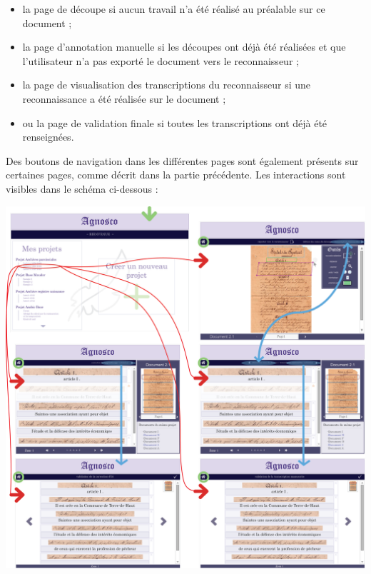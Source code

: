 \begin{itemize}
\item la page de découpe si aucun travail n’a été réalisé au préalable sur ce document ;
\item la page d’annotation manuelle si les découpes ont déjà été réalisées et que l’utilisateur n’a pas exporté le document vers le reconnaisseur ;
\item la page de visualisation des transcriptions du reconnaisseur si une reconnaissance a été réalisée sur le document ;
\item ou la page de validation finale si toutes les transcriptions ont déjà été renseignées.
\end{itemize}

Des boutons de navigation dans les différentes pages sont également présents sur certaines pages, comme décrit dans la partie précédente. Les interactions sont visibles dans le schéma ci-dessous :

\begin{mdframed}[frametitle={Figure 7 : Schéma des interactions entre les différents composants de l'IHM}, innerbottommargin=10]
\begin{center}
\includegraphics[scale=0.5]{assets/schemaIHMinteractions.png}
\end{center}
\end{mdframed}

